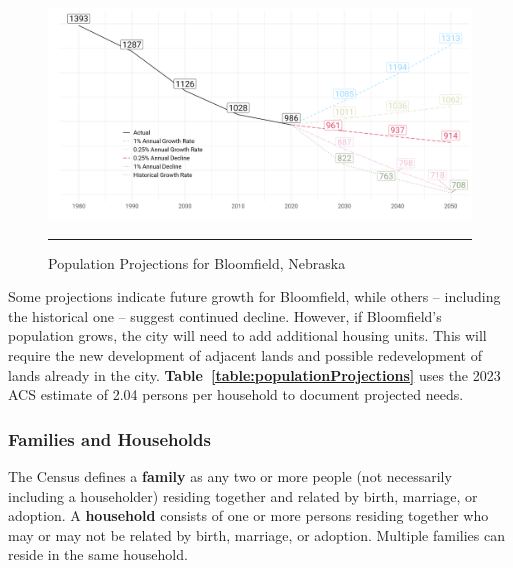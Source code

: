 \begin{figure}[H]
\centering
\begin{framed}
    \caption{Population Projections for Bloomfield, Nebraska}
    \label{fig:populationProjections}
    \includegraphics[width=\linewidth]{figures/population_projections.png}
    \rule[-5pt]{\linewidth}{0.4pt}
\end{framed}
\end{figure}

\noindent Some projections indicate future growth for Bloomfield, while others -- including the historical one -- suggest continued decline. However, if Bloomfield's population grows, the city will need to add additional housing units. This will require the new development of adjacent lands and possible redevelopment of lands already in the city. \textbf{Table~\ref{table:populationProjections}} uses the 2023 ACS estimate of 2.04 persons per household to document projected needs.



\pagebreak
\subsubsection*{Families and Households}
\noindent The Census defines a \textbf{family} as any two or more people (not necessarily including a householder) residing together and related by birth, marriage, or adoption. A \textbf{household} consists of one or more persons residing together who may or may not be related by birth, marriage, or adoption. Multiple families can reside in the same household.\\

